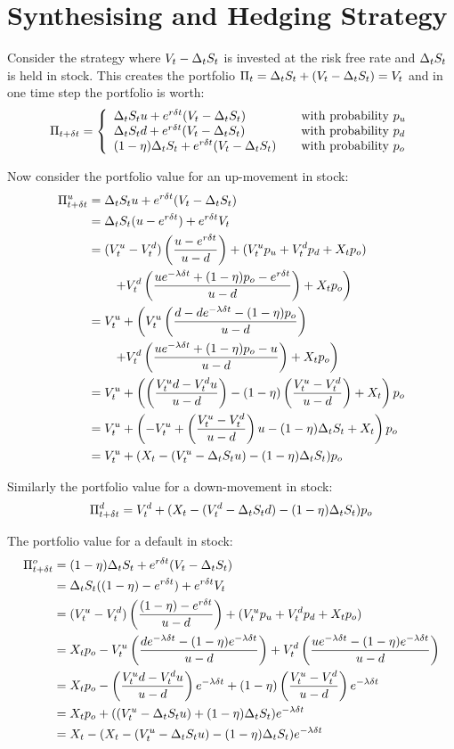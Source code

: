 \documentclass[a4paper,11pt,oneside]{report}
\theoremstyle{plain}
\theoremstyle{definition}
\begin{document}
\section{Synthesising and Hedging Strategy}
Consider the strategy where $V_t - \Delta_tS_t$ is invested at the risk free rate and $\Delta_tS_t$ is held in stock.  This creates the portfolio $\Pi_t = \Delta_tS_t + (V_t - \Delta_tS_t) = V_t$ and in one time step the portfolio is worth:
\begin{equation}
 \PDt = \left\{\begin{array}{l@{\qquad\text{with probability }}l}
                \D\S\u + e^{r\Dt}(\V - \D\S)         & \pu \\
                \D\S\d + e^{r\Dt}(\V - \D\S)         & \pd \\
                (1 - \eta)\D\S + e^{r\Dt}(\V - \D\S) & \po
               \end{array}\right. \label{eq:PDt}
\end{equation}

Now consider the portfolio value for an up-movement in stock:
\begin{align}
 \PDt^u &= \D\S\u + e^{r\Dt}(\V - \D\S) \n
        &= \D\S(\u - e^{r\Dt}) + e^{r\Dt}\V \n
        &= (\Vu - \Vd)\left(\frac{\u - e^{r\Dt}}{u - d}\right) + (\Vu\pu + \Vd\pd + \X\po) \n
%
        &\qquad \left.+ \Vd\left(\frac{\u e^{-\lambda\Dt} + (1 - \eta)\po - e^{r\Dt}}{\u - \d}\right) + \X\po\right) \n
%
        &= \Vu + \left(\Vu\left(\frac{\d - \d e^{-\lambda\Dt} - (1 - \eta)\po}{\u - \d}\right)\right. \n
        &\qquad \left.+ \Vd\left(\frac{\u e^{-\lambda\Dt} + (1 - \eta)\po - \u}{\u - \d}\right) + \X\po\right) \n
%
        &= \Vu + \left(\left(\frac{\Vu\d - \Vd\u}{\u - \d}\right) - (1 - \eta)\left(\frac{\Vu - \Vd}{\u - \d}\right) + \X\right)\po \n
        &= \Vu + \left(-\Vu + \left(\frac{\Vu - \Vd}{\u - \d}\right)\u - (1 - \eta)\D\S + \X\right)\po \n
        &= \Vu + (\X - (\Vu  - \D\S\u) - (1 - \eta)\D\S)\po
\end{align}

Similarly the portfolio value for a down-movement in stock:
\begin{equation}
 \Pi_{t + \delta t}^d = V^{d}_t + (X_t - (V^{d}_t  - \Delta_tS_td) - (1 - \eta)\Delta_tS_t)p_o
\end{equation}

The portfolio value for a default in stock:
\begin{align}
 \Pi_{t + \delta t} ^o &= (1 - \eta)\Delta_tS_t + e^{r\delta t}(V_t - \Delta_tS_t) \nonumber\\
         &= \Delta_tS_t((1 - \eta) - e^{r\delta t}) + e^{r\delta t}V_t \nonumber\\
         &= (V^{u}_t - V^{d}_t)\left(\frac{(1 - \eta) - e^{r\delta t}}{u - d}\right) + (V^{u}_tp_u + V^{d}_tp_d + X_tp_o) \nonumber\\
         &= X_tp_o - V^{u}_t\left(\frac{d e^{-\lambda\delta t} - (1 - \eta)e^{-\lambda\delta t}}{u - d}\right) + V^{d}_t\left(\frac{u e^{-\lambda\delta t} - (1 - \eta)e^{-\lambda\delta t}}{u - d}\right) \nonumber\\
         &= X_tp_o - \left(\frac{V^{u}_td - V^{d}_tu}{u - d}\right)e^{-\lambda\delta t} + (1 - \eta)\left(\frac{V^{u}_t - V^{d}_t}{u - d}\right)e^{-\lambda\delta t} \nonumber\\
         &= X_tp_o + ((V^{u}_t - \Delta_tS_tu) + (1 - \eta)\Delta_tS_t)e^{-\lambda\delta t} \nonumber\\
         &= X_t - (X_t - (V^{u}_t - \Delta_tS_tu) - (1 - \eta)\Delta_tS_t)e^{-\lambda\delta t} \nonumber\\
\end{align}
\end{document}
